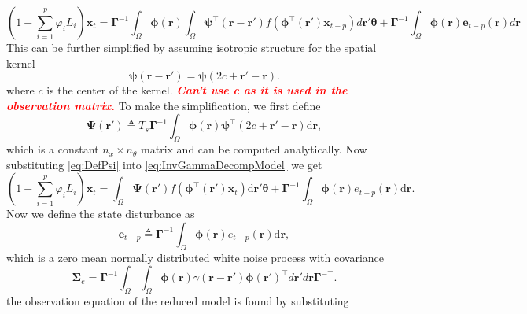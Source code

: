 \documentclass[a4paper,10pt]{article}
\newcommand{\dean}[1]{\textsf{\emph{\textbf{\textcolor{red}{#1}}}}}
\begin{document}
\begin{equation}\label{eq:InvGammaDecompModel}
 (1+\sum_{i=1}^{p}\varphi_i L_i)
\mathbf{x}_t=\boldsymbol\Gamma^{-1}\int_{\Omega}\boldsymbol \phi(\mathbf
r)\int_{\Omega}\boldsymbol{\psi}^\top\left(\mathbf{r}-\mathbf{r}'\right)
f(\boldsymbol{\phi}^{\top}\left(\mathbf{r'}\right) \mathbf{x}_{t-p})d\mathbf
r'\boldsymbol{\theta}+\boldsymbol\Gamma^{-1}\int_{\Omega}\boldsymbol\phi(\mathbf
r)\mathbf e_{t-p}(\mathbf r)d\mathbf r
\end{equation}
This can be further simplified by assuming isotropic structure for the spatial
kernel
\begin{equation}
	\boldsymbol{\psi} (\mathbf{r}-\mathbf{r}') = \boldsymbol{\psi}
(2c+\mathbf{r}'-\mathbf{r}).
\end{equation}
where $c$ is the center of the kernel. \dean{Can't use c as it is used in the
observation matrix.} To make the simplification, we first define
\begin{equation}\label{eq:DefPsi}
	\boldsymbol{\Psi}(\mathbf{r}') \triangleq
T_s\boldsymbol{\Gamma}^{-1}\int_\Omega
{\boldsymbol{\phi}(\mathbf{r})\boldsymbol{\psi}^{\top}
(2c+\mathbf{r}'-\mathbf{r})\textrm{d}\mathbf{r}},
\end{equation}
which is a constant $n_x \times n_{\theta}$ matrix and can be computed
analytically. Now substituting \eqref{eq:DefPsi} into
\eqref{eq:InvGammaDecompModel} we get
\begin{equation}
(1+\sum_{i=1}^{p}\varphi_i L_i) \mathbf{x}_t = \int_\Omega
\boldsymbol{\Psi}(\mathbf{r}')
f(\boldsymbol{\phi}^{\top}(\mathbf{r}')\mathbf{x}_t) \textrm{d}\mathbf{r}'
\boldsymbol{\theta}
+ \boldsymbol{\Gamma}^{-1}
\int_\Omega{\boldsymbol{\phi}(\mathbf{r})e_{t-p}(\mathbf{r})\textrm{d}\mathbf{r}
}.
\end{equation}
Now we define the state disturbance as
\begin{equation}\label{eq:Wt} 
	\mathbf{e}_{t-p} \triangleq \boldsymbol{\Gamma}^{-1}\int_\Omega
{\boldsymbol{\phi} ( \mathbf{r} )e_{t-p}( \mathbf{r} )\textrm{d}\mathbf{r}},
\end{equation}
which is a zero mean normally distributed white noise process with covariance
\begin{equation}
	\boldsymbol\Sigma_e
=\mathbf{\Gamma}^{-1}\int_{\Omega}\int_{\Omega}\boldsymbol{\phi}\left(\mathbf
r\right) \gamma\left(\mathbf r- \mathbf r' \right)\boldsymbol{\phi}\left(\mathbf
r'\right)^{\top}d\mathbf r' d\mathbf r\mathbf{\Gamma}^{- \top}. 
\end{equation}
the observation equation of the reduced model is found by substituting
\end{document}
